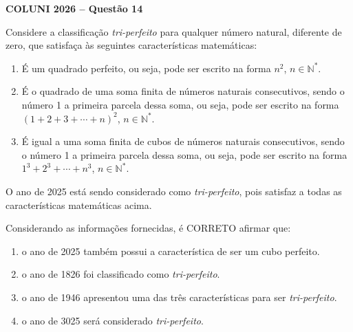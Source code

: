 \textbf{COLUNI 2026 -- Questão 14}\par\medskip Considere a classificação \textit{tri-perfeito} para qualquer número natural, diferente de zero, que satisfaça às seguintes características matemáticas:
\begin{enumerate}
\item[I.] É um quadrado perfeito, ou seja, pode ser escrito na forma $n^2$, $n\in\mathbb{N}^*$.
\item[II.] É o quadrado de uma soma finita de números naturais consecutivos, sendo o número 1 a primeira parcela dessa soma, ou seja, pode ser escrito na forma $(1+2+3+\cdots+n)^2$, $n\in\mathbb{N}^*$.
\item[III.] É igual a uma soma finita de cubos de números naturais consecutivos, sendo o número 1 a primeira parcela dessa soma, ou seja, pode ser escrito na forma $1^3+2^3+\cdots+n^3$, $n\in\mathbb{N}^*$.
\end{enumerate}
O ano de 2025 está sendo considerado como \textit{tri-perfeito}, pois satisfaz a todas as características matemáticas acima.

Considerando as informações fornecidas, é CORRETO afirmar que:
\begin{enumerate}
\item o ano de 2025 também possui a característica de ser um cubo perfeito.
\item o ano de 1826 foi classificado como \textit{tri-perfeito}.
\item o ano de 1946 apresentou uma das três características para ser \textit{tri-perfeito}.
\item o ano de 3025 será considerado \textit{tri-perfeito}.
\end{enumerate}
